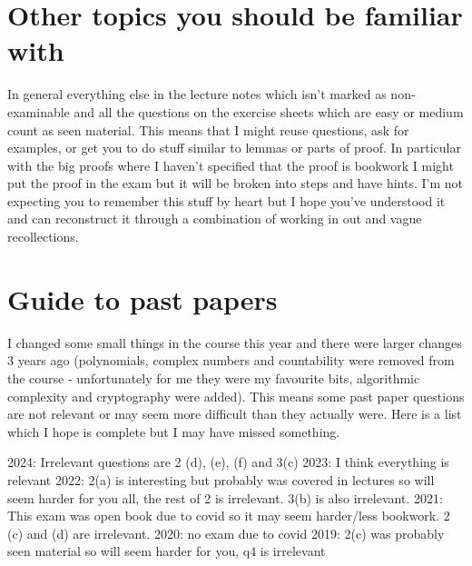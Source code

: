 \documentclass[
]{book}
\theoremstyle{definition}
\theoremstyle{definition}
\theoremstyle{definition}
\theoremstyle{definition}
\theoremstyle{remark}
\begin{document}
\section{Other topics you should be familiar with}\label{other-topics-you-should-be-familiar-with}

In general everything else in the lecture notes which isn't marked as non-examinable and all the questions on the exercise sheets which are easy or medium count as seen material. This means that I might reuse questions, ask for examples, or get you to do stuff similar to lemmas or parts of proof. In particular with the big proofs where I haven't specified that the proof is bookwork I might put the proof in the exam but it will be broken into steps and have hints. I'm not expecting you to remember this stuff by heart but I hope you've understood it and can reconstruct it through a combination of working in out and vague recollections.

\section{Guide to past papers}\label{guide-to-past-papers}

I changed some small things in the course this year and there were larger changes 3 years ago (polynomials, complex numbers and countability were removed from the course - unfortunately for me they were my favourite bits, algorithmic complexity and cryptography were added). This means some past paper questions are not relevant or may seem more difficult than they actually were. Here is a list which I hope is complete but I may have missed something.

2024: Irrelevant questions are 2 (d), (e), (f) and 3(c)
2023: I think everything is relevant
2022: 2(a) is interesting but probably was covered in lectures so will seem harder for you all, the rest of 2 is irrelevant. 3(b) is also irrelevant.
2021: This exam was open book due to covid so it may seem harder/less bookwork. 2 (c) and (d) are irrelevant.
2020: no exam due to covid
2019: 2(c) was probably seen material so will seem harder for you, q4 is irrelevant

  
\end{document}

